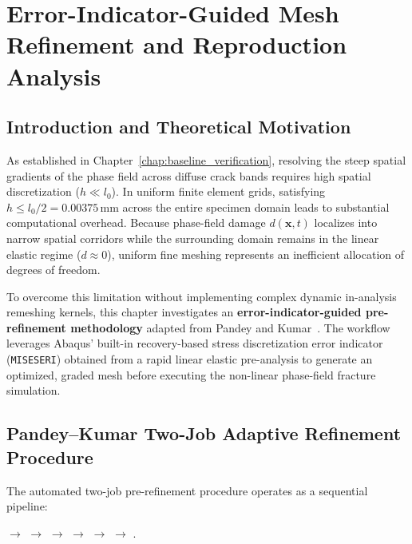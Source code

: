 \chapter{Error-Indicator-Guided Mesh Refinement and Reproduction Analysis}
\label{chap:miseseri_refinement}

\section{Introduction and Theoretical Motivation}
\label{sec:miseseri_intro}

As established in Chapter~\ref{chap:baseline_verification}, resolving the steep spatial gradients of the phase field across diffuse crack bands requires high spatial discretization ($h \ll l_0$). In uniform finite element grids, satisfying $h \le l_0/2 = 0.00375\,\text{mm}$ across the entire specimen domain leads to substantial computational overhead. Because phase-field damage $d(\mathbf{x}, t)$ localizes into narrow spatial corridors while the surrounding domain remains in the linear elastic regime ($d \approx 0$), uniform fine meshing represents an inefficient allocation of degrees of freedom.

To overcome this limitation without implementing complex dynamic in-analysis remeshing kernels, this chapter investigates an \textbf{error-indicator-guided pre-refinement methodology} adapted from Pandey and Kumar~\cite{pandey2025}. The workflow leverages Abaqus' built-in recovery-based stress discretization error indicator (\texttt{MISESERI}) obtained from a rapid linear elastic pre-analysis to generate an optimized, graded mesh before executing the non-linear phase-field fracture simulation.

\section{Pandey--Kumar Two-Job Adaptive Refinement Procedure}
\label{sec:miseseri_workflow}

The automated two-job pre-refinement procedure operates as a sequential pipeline:
\begin{center}
\setlength{\fboxsep}{4pt}
$\rightarrow$ 
$\rightarrow$ 
$\rightarrow$ 
$\rightarrow$ 
$\rightarrow$ 
$\rightarrow$ .
\end{center}

